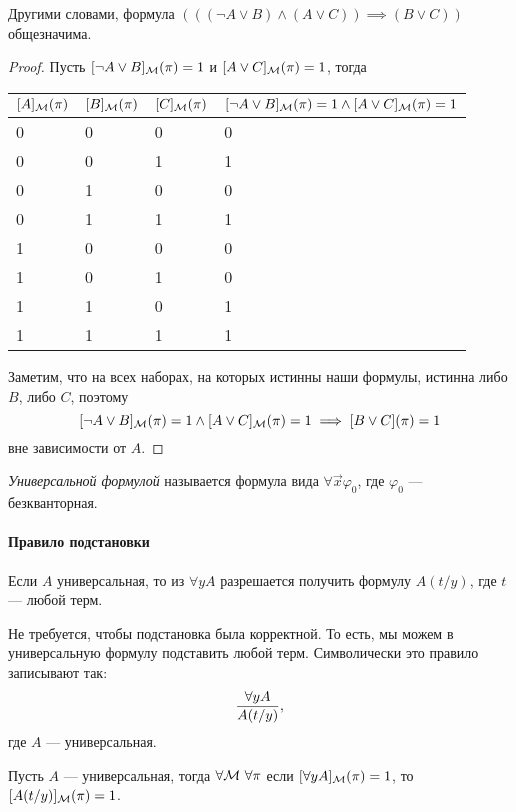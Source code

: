 Другими словами, формула $(((\neg A \lor B) \land (A \lor C)) \implies (B \lor C))$ общезначима.

\begin{proof}
    Пусть $[\neg A \lor B]_{\mathcal{M}}(\pi) = 1$ и $[A \lor C]_{\mathcal{M}}(\pi) = 1$, тогда
    \begin{table}[h!]
        \centering
        \begin{tabular}{|l|l|l|l|}
            \hline
            $[A]_{\mathcal{M}}(\pi)$ & $[B]_{\mathcal{M}}(\pi)$ & $[C]_{\mathcal{M}}(\pi)$ & $[\neg A \lor B]_{\mathcal{M}}(\pi) = 1 \land [A \lor C]_{\mathcal{M}}(\pi) = 1$ \\ \hline
            0 & 0 & 0 & 0 \\ \hline
            0 & 0 & 1 & 1 \\ \hline
            0 & 1 & 0 & 0 \\ \hline
            0 & 1 & 1 & 1 \\ \hline
            1 & 0 & 0 & 0 \\ \hline
            1 & 0 & 1 & 0 \\ \hline
            1 & 1 & 0 & 1 \\ \hline
            1 & 1 & 1 & 1 \\ \hline
        \end{tabular}
    \end{table}
    Заметим, что на всех наборах, на которых истинны наши формулы, истинна либо $B$, либо $C$, поэтому
    $$
        [\neg A \lor B]_{\mathcal{M}}(\pi) = 1 \land [A \lor C]_{\mathcal{M}}(\pi) = 1 \implies [B \lor C](\pi) = 1
    $$
    вне зависимости от $A$.
\end{proof}

\begin{definition}
    {\it Универсальной формулой} называется формула вида $\forall \vec{x} \varphi_{0}$, где $\varphi_{0}$ --- безкванторная.
\end{definition}

\paragraph{Правило подстановки}
Если $A$ универсальная, то из $\forall y A$ разрешается получить формулу $A(t/y)$, где $t$ --- любой терм.

Не требуется, чтобы подстановка была корректной.
То есть, мы можем в универсальную формулу подставить любой терм.
Символически это правило записывают так:
$$
    \displaystyle\frac{\forall y A}{A(t/y)},
$$
где $A$ --- универсальная.

\begin{statement}
    Пусть $A$ --- универсальная, тогда $\forall \mathcal{M}~ \forall \pi$ если $[\forall y A]_{\mathcal{M}}(\pi) = 1$, то $[A(t/y)]_{\mathcal{M}}(\pi) = 1$.
\end{statement}

